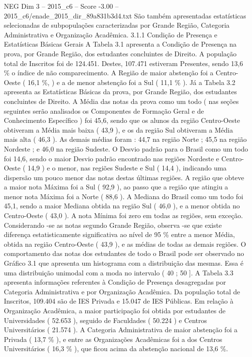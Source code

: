 \begin{textsample}{NEG Dim 3 – 2015\_c6 – Score -3.00 – 2015\_c6/enade\_2015\_dir\_89a831b3d4.txt}
São também apresentadas estatísticas selecionadas de subpopulações caracterizadas por Grande Região, Categoria Administrativa e Organização Acadêmica. 3.1.1 Condição de Presença e Estatísticas Básicas Gerais A Tabela 3.1 apresenta a Condição de Presença na prova, por Grande Região, dos estudantes concluintes de Direito.
A população total de Inscritos foi de 124.451.
Destes, 107.471 estiveram Presentes, sendo 13,6 \% o índice de não comparecimento.
A Região de maior abstenção foi a Centro-Oeste ( 16,1 \%, ) e a de menor abstenção foi a Sul ( 11,1 \% ).
Já a Tabela 3.2 apresenta as Estatísticas Básicas da prova, por Grande Região, dos estudantes concluintes de Direito.
A Média das notas da prova como um todo ( nas seções seguintes serão analisados os Componentes de Formação Geral e de Conhecimento Específico ) foi 45,6, sendo que os alunos da região Centro-Oeste obtiveram a Média mais baixa ( 43,9 ), e os da região Sul obtiveram a Média mais alta ( 46,3 ).
As demais médias foram : 44,7 na região Norte ; 45,5 na região Nordeste ; e 46,0 na região Sudeste.
O Desvio padrão para o Brasil como um todo foi 14,6, sendo o maior Desvio padrão encontrado nas regiões Nordeste e Centro-Oeste ( 14,9 ) e o menor, nas regiões Sudeste e Sul ( 14,4 ), indicando uma dispersão um pouco menor das notas destas últimas regiões.
A região que obteve a maior nota Máxima foi a Sul ( 92,9 ), ao passo que a região que atingiu a menor nota Máxima foi a Norte ( 88,6 ).
A Mediana do Brasil como um todo foi 45,1, sendo a maior Mediana obtida na região Sul ( 46,0 ), e a menor obtida no Centro-Oeste ( 43,0 ).
A nota Mínima foi zero em todas as regiões, sem exceção.
Considerando -se as notas segundo Grande Região, observa -se que existe diferença estatisticamente significativa ao nível de 95 \% entre a menor Média, obtida na região Centro-Oeste ( 43,9 ), e as médias de todas as demais regiões.
O comportamento das notas dos estudantes de todo o Brasil pode ser observado no Gráfico 3.1 que apresenta um histograma com a distribuição das mesmas.
Essa é uma distribuição unimodal com a moda no intervalo ( 40 ; 50 ].
A Tabela 3.3 apresenta informações referentes à Condição de Presença desagregadas por Categoria Administrativa e por Organização Acadêmica.
Da população total de Inscritos, 109.404 são de IES Privada e 15.047 de IES Públicas.
Em relação à Organização Acadêmica, a maior participação foi obtida por estudantes de Universidades ( 52.653 ), seguido de Faculdades ( 50.224 ) e Centros Universitários ( 21.574 ).
A Categoria Administrativa de maior abstenção foi a Privada ( 13,7 \% ), e entre as Organizações Acadêmicas foi a dos Centros Universitários ( 16,3 \% ), que ficou acima da abstenção nacional de 13,6 \%.

\end{textsample}

